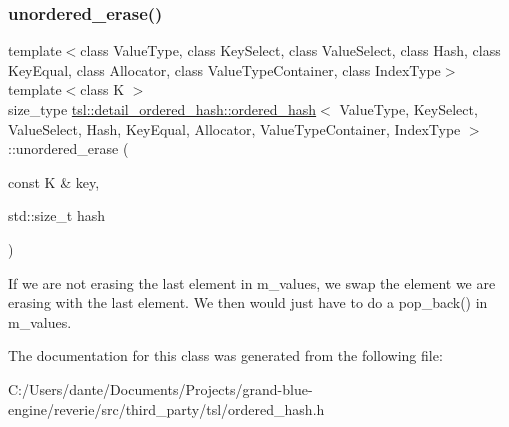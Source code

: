 \subsubsection{\texorpdfstring{unordered\_erase()}{unordered\_erase()}\hspace{0.1cm}{\footnotesize\ttfamily [2/2]}}
{\footnotesize\ttfamily template$<$class Value\+Type, class Key\+Select, class Value\+Select, class Hash, class Key\+Equal, class Allocator, class Value\+Type\+Container, class Index\+Type$>$ \\
template$<$class K $>$ \\
size\+\_\+type \mbox{\hyperlink{classtsl_1_1detail__ordered__hash_1_1ordered__hash}{tsl\+::detail\+\_\+ordered\+\_\+hash\+::ordered\+\_\+hash}}$<$ Value\+Type, Key\+Select, Value\+Select, Hash, Key\+Equal, Allocator, Value\+Type\+Container, Index\+Type $>$\+::unordered\+\_\+erase (\begin{DoxyParamCaption}\item[{const K \&}]{key,  }\item[{std\+::size\+\_\+t}]{hash }\end{DoxyParamCaption})\hspace{0.3cm}{\ttfamily [inline]}}

If we are not erasing the last element in m\+\_\+values, we swap the element we are erasing with the last element. We then would just have to do a pop\+\_\+back() in m\+\_\+values.

The documentation for this class was generated from the following file\+:\begin{DoxyCompactItemize}
\item 
C\+:/\+Users/dante/\+Documents/\+Projects/grand-\/blue-\/engine/reverie/src/third\+\_\+party/tsl/ordered\+\_\+hash.\+h\end{DoxyCompactItemize}
